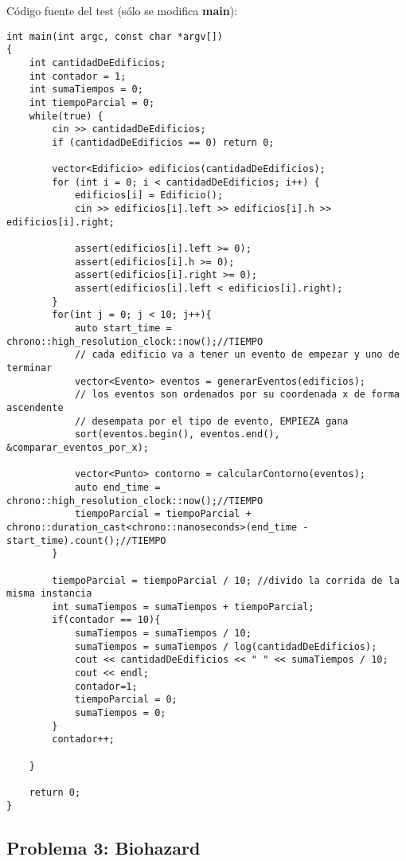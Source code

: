Código fuente del test (sólo se modifica \textbf{main}):
\begin{lstlisting}[frame=single]
int main(int argc, const char *argv[])
{
    int cantidadDeEdificios;
    int contador = 1;
    int sumaTiempos = 0;
    int tiempoParcial = 0;
    while(true) {
        cin >> cantidadDeEdificios;
        if (cantidadDeEdificios == 0) return 0;

        vector<Edificio> edificios(cantidadDeEdificios);
        for (int i = 0; i < cantidadDeEdificios; i++) {
            edificios[i] = Edificio();
            cin >> edificios[i].left >> edificios[i].h >> edificios[i].right;

            assert(edificios[i].left >= 0);
            assert(edificios[i].h >= 0);
            assert(edificios[i].right >= 0);
            assert(edificios[i].left < edificios[i].right);
        }
        for(int j = 0; j < 10; j++){
            auto start_time = chrono::high_resolution_clock::now();//TIEMPO
            // cada edificio va a tener un evento de empezar y uno de terminar
            vector<Evento> eventos = generarEventos(edificios);
            // los eventos son ordenados por su coordenada x de forma ascendente
            // desempata por el tipo de evento, EMPIEZA gana
            sort(eventos.begin(), eventos.end(), &comparar_eventos_por_x);

            vector<Punto> contorno = calcularContorno(eventos);
            auto end_time = chrono::high_resolution_clock::now();//TIEMPO
            tiempoParcial = tiempoParcial + chrono::duration_cast<chrono::nanoseconds>(end_time - start_time).count();//TIEMPO
        }
        
        tiempoParcial = tiempoParcial / 10; //divido la corrida de la misma instancia
        int sumaTiempos = sumaTiempos + tiempoParcial;
        if(contador == 10){
            sumaTiempos = sumaTiempos / 10;
            sumaTiempos = sumaTiempos / log(cantidadDeEdificios);
            cout << cantidadDeEdificios << " " << sumaTiempos / 10;
            cout << endl;
            contador=1;
            tiempoParcial = 0;
            sumaTiempos = 0;
        }
        contador++;

    }

    return 0;
}
\end{lstlisting}

\subsection{Problema 3: Biohazard}


